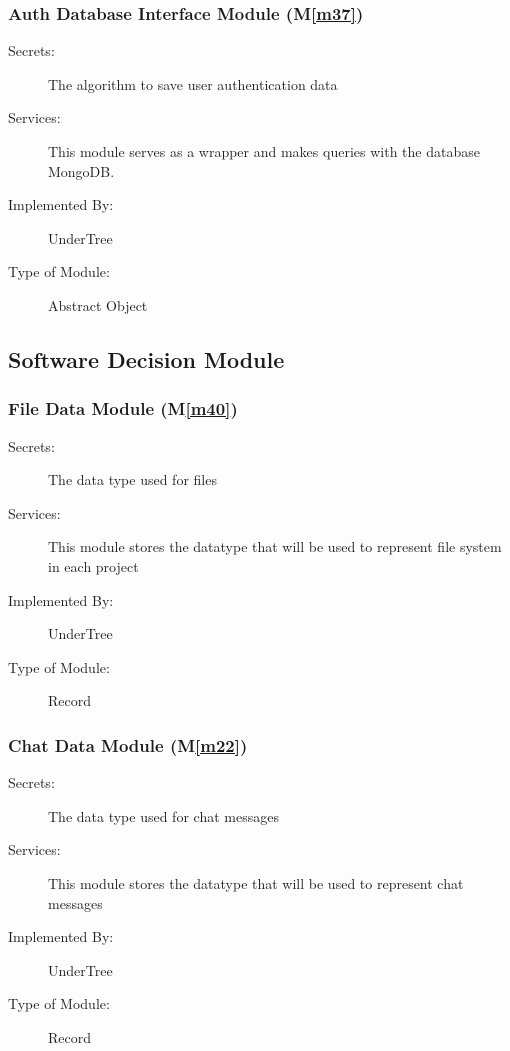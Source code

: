 \documentclass[12pt, titlepage]{article}
\newcommand{\mref}[1]{M\ref{#1}}
\begin{document}
	\subsubsection{Auth Database Interface Module (\mref{m37})}
	
	\begin{description}
		\item[Secrets:] The algorithm to save user authentication data
		\item[Services:] This module serves as a wrapper and makes queries with the database MongoDB.
		\item[Implemented By:] UnderTree
		\item[Type of Module:] Abstract Object
	\end{description}
	
	\subsection{Software Decision Module}
	
	\subsubsection{File Data Module (\mref{m40})}
	
	\begin{description}
		\item[Secrets:] The data type used for files
		\item[Services:] This module stores the datatype that will be used to represent file system in each project
		\item[Implemented By:] UnderTree
		\item[Type of Module:] Record
	\end{description}
	
	\subsubsection{Chat Data Module (\mref{m22})}
	
	\begin{description}
		\item[Secrets:] The data type used for chat messages
		\item[Services:] This module stores the datatype that will be used to represent chat messages
		\item[Implemented By:] UnderTree
		\item[Type of Module:] Record
	\end{description}
	
\end{document}
